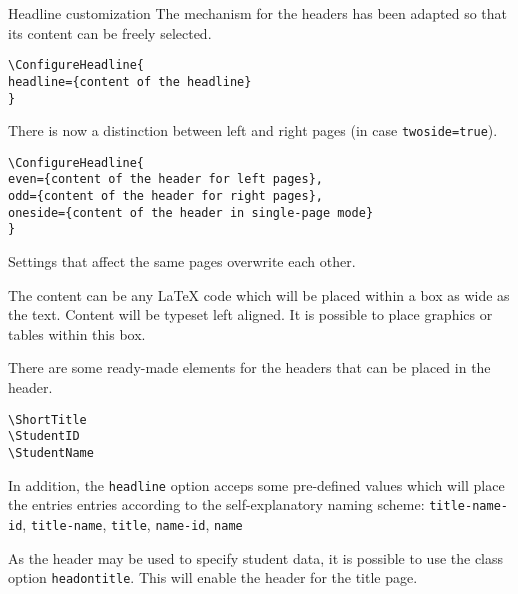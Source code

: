 \documentclass[
	english,%
	accentcolor=9c,%
	points=true, to activate referencing task properties
]{tudaexercise}
\newcommand*{\option}[1]{\texttt{#1}}
\begin{document}
\begin{task}{Headline customization}
	The mechanism for the headers has been adapted so that its content can be freely selected.

\begin{verbatim}
\ConfigureHeadline{
headline={content of the headline}
}
\end{verbatim}

	There is now a distinction between left and right pages (in case \option{twoside=true}).
\begin{verbatim}
\ConfigureHeadline{
even={content of the header for left pages},
odd={content of the header for right pages},
oneside={content of the header in single-page mode}
}
\end{verbatim}

	Settings that affect the same pages overwrite each other.

	\begin{subtask}[title={Custom content for headlines}]
		The content can be any \LaTeX{} code which will be placed within a box as wide as the text.
		Content will be typeset left aligned.
		It is possible to place graphics or tables within this box.

		There are some ready-made elements for the headers that can be placed in the header.
\begin{verbatim}
\ShortTitle
\StudentID
\StudentName
\end{verbatim}
	\end{subtask}

	\begin{subtask}[title={Predefined header options}]
		In addition, the \option{headline} option acceps some pre-defined values which will place the entries entries according to the self-explanatory naming scheme:
		\option{title-name-id}, \option{title-name}, \option{title}, \option{name-id}, \option{name}
	\end{subtask}

	\begin{subtask}[title={Enable the header for the title page}]
		As the header may be used to specify student data, it is possible to use the class option \option{headontitle}. This will enable the header for the title page.
	\end{subtask}
\end{task}
\end{document}
